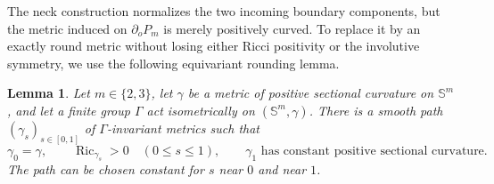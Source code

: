 \documentclass[11pt,reqno]{amsart}
\newtheorem{lemma}[theorem]{Lemma}
\theoremstyle{definition}
\numberwithin{equation}{section}
\DeclareMathOperator{\Ric}{Ric}
\begin{document}
The neck construction normalizes the two incoming boundary components,
but the metric induced on $\partial_oP_m$ is merely positively curved.
To replace it by an exactly round metric without losing either Ricci
positivity or the involutive symmetry, we use the following equivariant
rounding lemma.

\begin{lemma}
\label{lem:unified-round-path}
Let $m\in\{2,3\}$, let $\gamma$ be a metric of positive sectional
curvature on $\mathbb S^m$, and let a finite group $\Gamma$ act isometrically
on $(\mathbb S^m,\gamma)$.  There is a smooth path
$(\gamma_s)_{s\in[0,1]}$ of $\Gamma$-invariant metrics such that
\[
 \gamma_0=\gamma,\qquad \Ric_{\gamma_s}>0\quad(0\le s\le1),
 \qquad \gamma_1\text{ has constant positive sectional curvature}.
\]
The path can be chosen constant for $s$ near $0$ and near $1$.
\end{lemma}
\end{document}
